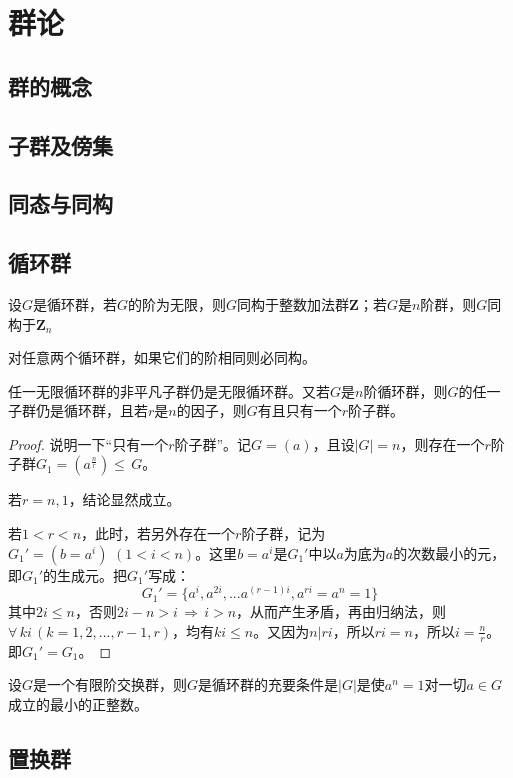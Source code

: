 \section{群论}
\subsection{群的概念}
\subsection{子群及傍集}
\subsection{同态与同构}
\subsection{循环群}

\begin{theorem}
	设$G$是循环群，若$G$的阶为无限，则$G$同构于整数加法群$\mathbf{Z}$；若$G$是$n$阶群，则$G$同构于$\mathbf{Z}_{n}$
\end{theorem}

\begin{corollary}
	对任意两个循环群，如果它们的阶相同则必同构。
\end{corollary}

\begin{theorem}
	任一无限循环群的非平凡子群仍是无限循环群。又若$G$是$n$阶循环群，则$G$的任一子群仍是循环群，且若$r$是$n$的因子，则$G$有且只有一个$r$阶子群。
\end{theorem}
\begin{proof}
	说明一下“只有一个$r$阶子群”。记$G=(a)$，且设$|G|=n$，则存在一个$r$阶子群$G_{1}=(a^{\frac{n}{r}})\leq \, G$。\par
	若$r=n,1$，结论显然成立。\par
	若$1<r<n$，此时，若另外存在一个$r$阶子群，记为$G_{1}'=(b=a^{i})\, \, (1< i< n)$。这里$b=a^{i}$是$G_{1}'$中以$a$为底为$a$的次数最小的元，即$G_{1}'$的生成元。把$G_{1}'$写成：
	\begin{equation*}
		G_{1}'=\{a^{i},a^{2i},...a^{(r-1)i},a^{ri}=a^{n}=1\}
	\end{equation*}
	其中$2i\leq n$，否则$2i-n>i\, \Rightarrow \, i>n$，从而产生矛盾，再由归纳法，则$\forall \, ki\,(k=1,2,...,r-1,r)$，均有$ki\leq n$。又因为$n\big| ri$，所以$ri=n$，所以$i=\frac{n}{r}$。即$G_{1}'=G_{1}$。
\end{proof}
\begin{theorem}\label{Yth020403}
	设$G$是一个有限阶交换群，则$G$是循环群的充要条件是$|G|$是使$a^{n}=1$对一切$a\in G$成立的最小的正整数。
\end{theorem}


\subsection{置换群}